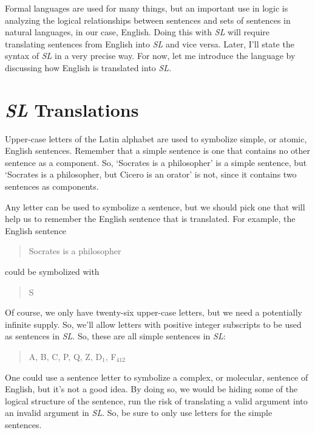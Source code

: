 \documentclass[../logic-text.tex]{subfiles}
\begin{document}
Formal languages are used for many things, but an important use in logic is analyzing the logical relationships between sentences and sets of sentences in natural languages, in our case, English. Doing this with \emph{SL} will require translating sentences from English into \emph{SL} and vice versa. Later, I'll state the syntax of \emph{SL} in a very precise way. For now, let me introduce the language by discussing how English is translated into \emph{SL}.

\section{\emph{SL} Translations}
\label{sec:sl-translations}

Upper-case letters of the Latin alphabet are used to symbolize simple, or atomic, English sentences. Remember that a simple sentence is one that contains no other sentence as a component. So, \enquote*{Socrates is a philosopher} is a simple sentence, but \enquote*{Socrates is a philosopher, but Cicero is an orator} is not, since it contains two sentences as components.

Any letter can be used to symbolize a sentence, but we should pick one that will help us to remember the English sentence that is translated. For example, the English sentence

\begin{quote}
Socrates is a philosopher
\end{quote}

could be symbolized with

\begin{quote}
S
\end{quote}

Of course, we only have twenty-six upper-case letters, but we need a potentially infinite supply. So, we'll allow letters with positive integer subscripts to be used as sentences in \emph{SL}. So, these are all simple sentences in \emph{SL}:

\begin{quote}
A, B, C, P, Q, Z, D\(_{1}\), F\(_{412}\)
\end{quote}

One could use a sentence letter to symbolize a complex, or molecular, sentence of English, but it's not a good idea. By doing so, we would be hiding some of the logical structure of the sentence, run the risk of translating a valid argument into an invalid argument in \emph{SL}. So, be sure to only use letters for the simple sentences.
\end{document}
